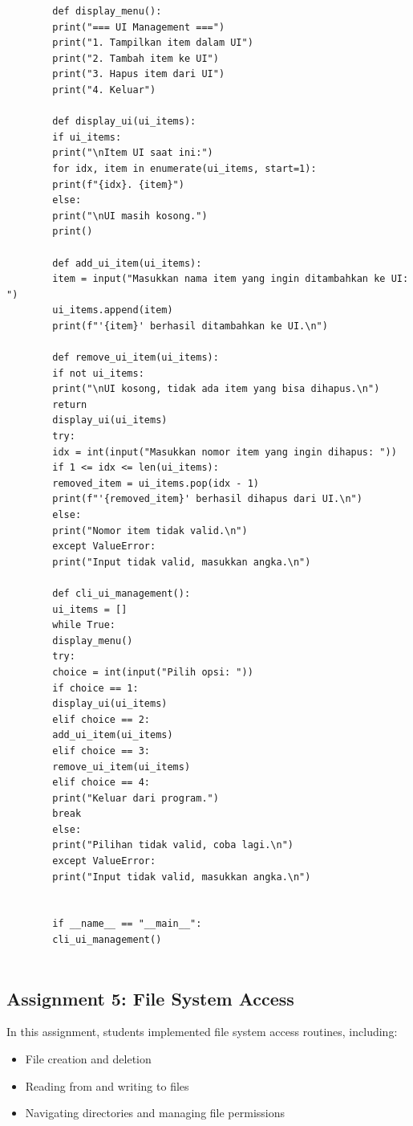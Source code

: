 \documentclass[12pt]{article}
\begin{document}
	
	\begin{lstlisting}
		def display_menu():
		print("=== UI Management ===")
		print("1. Tampilkan item dalam UI")
		print("2. Tambah item ke UI")
		print("3. Hapus item dari UI")
		print("4. Keluar")
		
		def display_ui(ui_items):
		if ui_items:
		print("\nItem UI saat ini:")
		for idx, item in enumerate(ui_items, start=1):
		print(f"{idx}. {item}")
		else:
		print("\nUI masih kosong.")
		print()
		
		def add_ui_item(ui_items):
		item = input("Masukkan nama item yang ingin ditambahkan ke UI: ")
		ui_items.append(item)
		print(f"'{item}' berhasil ditambahkan ke UI.\n")
		
		def remove_ui_item(ui_items):
		if not ui_items:
		print("\nUI kosong, tidak ada item yang bisa dihapus.\n")
		return
		display_ui(ui_items)
		try:
		idx = int(input("Masukkan nomor item yang ingin dihapus: "))
		if 1 <= idx <= len(ui_items):
		removed_item = ui_items.pop(idx - 1)
		print(f"'{removed_item}' berhasil dihapus dari UI.\n")
		else:
		print("Nomor item tidak valid.\n")
		except ValueError:
		print("Input tidak valid, masukkan angka.\n")
		
		def cli_ui_management():
		ui_items = []
		while True:
		display_menu()
		try:
		choice = int(input("Pilih opsi: "))
		if choice == 1:
		display_ui(ui_items)
		elif choice == 2:
		add_ui_item(ui_items)
		elif choice == 3:
		remove_ui_item(ui_items)
		elif choice == 4:
		print("Keluar dari program.")
		break
		else:
		print("Pilihan tidak valid, coba lagi.\n")
		except ValueError:
		print("Input tidak valid, masukkan angka.\n")
		
		
		if __name__ == "__main__":
		cli_ui_management()
		
	\end{lstlisting}
	
	
	\subsection{Assignment 5: File System Access}
	In this assignment, students implemented file system access routines, including:
	\begin{itemize}
		\item File creation and deletion
		\item Reading from and writing to files
		\item Navigating directories and managing file permissions
	\end{itemize}
	
\end{document}
